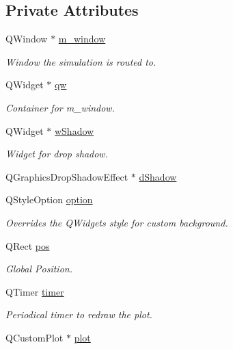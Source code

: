 \subsection*{Private Attributes}
\begin{DoxyCompactItemize}
\item 
Q\+Window $\ast$ \mbox{\hyperlink{classFluid_a138f09aa54f3209e67bf3e0a847bcdbc}{m\+\_\+window}}
\begin{DoxyCompactList}\small\item\em Window the simulation is routed to. \end{DoxyCompactList}\item 
Q\+Widget $\ast$ \mbox{\hyperlink{classFluid_a38ced692400072201566af41fd8fe5cd}{qw}}
\begin{DoxyCompactList}\small\item\em Container for m\+\_\+window. \end{DoxyCompactList}\item 
Q\+Widget $\ast$ \mbox{\hyperlink{classFluid_a55892004855abbf3458402a674add0e4}{w\+Shadow}}
\begin{DoxyCompactList}\small\item\em Widget for drop shadow. \end{DoxyCompactList}\item 
Q\+Graphics\+Drop\+Shadow\+Effect $\ast$ \mbox{\hyperlink{classFluid_a3e51c9ed538056955fd16efd6b8519a2}{d\+Shadow}}
\item 
Q\+Style\+Option \mbox{\hyperlink{classFluid_afcdad9ca2270eca892ebe19cc6eb0792}{option}}
\begin{DoxyCompactList}\small\item\em Overrides the Q\+Widget\textquotesingle{}s style for custom background. \end{DoxyCompactList}\item 
Q\+Rect \mbox{\hyperlink{classFluid_acc8b08224f3d6ee3a6d662c27562e1ab}{pos}}
\begin{DoxyCompactList}\small\item\em Global Position. \end{DoxyCompactList}\item 
Q\+Timer \mbox{\hyperlink{classFluid_a0765840a82e6ec401dea0cb65c435f5f}{timer}}
\begin{DoxyCompactList}\small\item\em Periodical timer to redraw the plot. \end{DoxyCompactList}\item 
Q\+Custom\+Plot $\ast$ \mbox{\hyperlink{classFluid_aa996761644ea1e220176f4983569bd4b}{plot}}

\end{DoxyCompactItemize}
